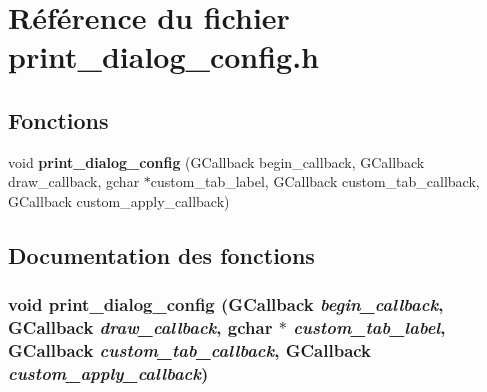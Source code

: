 \section{Référence du fichier print\_\-dialog\_\-config.h}
\label{print__dialog__config_8h}
\subsection*{Fonctions}
\begin{DoxyCompactItemize}
\item 
void {\bf print\_\-dialog\_\-config} (GCallback begin\_\-callback, GCallback draw\_\-callback, gchar $\ast$custom\_\-tab\_\-label, GCallback custom\_\-tab\_\-callback, GCallback custom\_\-apply\_\-callback)
\end{DoxyCompactItemize}


\subsection{Documentation des fonctions}
\subsubsection[{print\_\-dialog\_\-config}]{\setlength{\rightskip}{0pt plus 5cm}void print\_\-dialog\_\-config (GCallback {\em begin\_\-callback}, \/  GCallback {\em draw\_\-callback}, \/  gchar $\ast$ {\em custom\_\-tab\_\-label}, \/  GCallback {\em custom\_\-tab\_\-callback}, \/  GCallback {\em custom\_\-apply\_\-callback})}\label{print__dialog__config_8h_a7d3dcba0a3d4fe72caa34435200f1c22}
